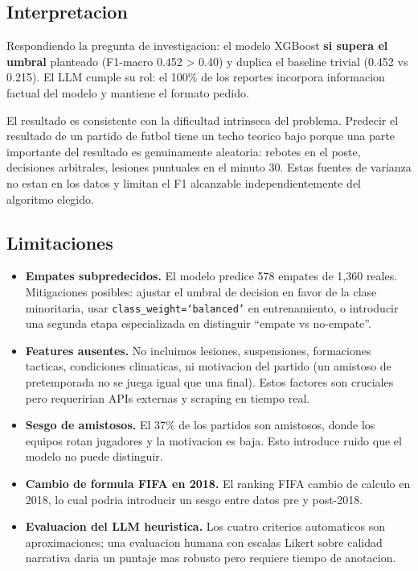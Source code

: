 \documentclass[10pt,twocolumn]{article}
\begin{document}
\subsection{Interpretacion}

Respondiendo la pregunta de investigacion: el modelo XGBoost \textbf{si supera el umbral} planteado (F1-macro 0.452 > 0.40) y duplica el baseline trivial (0.452 vs 0.215). El LLM cumple su rol: el 100\% de los reportes incorpora informacion factual del modelo y mantiene el formato pedido.

El resultado es consistente con la dificultad intrinseca del problema. Predecir el resultado de un partido de futbol tiene un techo teorico bajo porque una parte importante del resultado es genuinamente aleatoria: rebotes en el poste, decisiones arbitrales, lesiones puntuales en el minuto 30. Estas fuentes de varianza no estan en los datos y limitan el F1 alcanzable independientemente del algoritmo elegido.

\subsection{Limitaciones}

\begin{itemize}[leftmargin=*,topsep=2pt,itemsep=1pt]
  \item \textbf{Empates subpredecidos.} El modelo predice 578 empates de 1,360 reales. Mitigaciones posibles: ajustar el umbral de decision en favor de la clase minoritaria, usar \texttt{class\_weight=`balanced'} en entrenamiento, o introducir una segunda etapa especializada en distinguir ``empate vs no-empate''.
  \item \textbf{Features ausentes.} No incluimos lesiones, suspensiones, formaciones tacticas, condiciones climaticas, ni motivacion del partido (un amistoso de pretemporada no se juega igual que una final). Estos factores son cruciales pero requeririan APIs externas y scraping en tiempo real.
  \item \textbf{Sesgo de amistosos.} El 37\% de los partidos son amistosos, donde los equipos rotan jugadores y la motivacion es baja. Esto introduce ruido que el modelo no puede distinguir.
  \item \textbf{Cambio de formula FIFA en 2018.} El ranking FIFA cambio de calculo en 2018, lo cual podria introducir un sesgo entre datos pre y post-2018.
  \item \textbf{Evaluacion del LLM heuristica.} Los cuatro criterios automaticos son aproximaciones; una evaluacion humana con escalas Likert sobre calidad narrativa daria un puntaje mas robusto pero requiere tiempo de anotacion.
\end{itemize}
\end{document}
